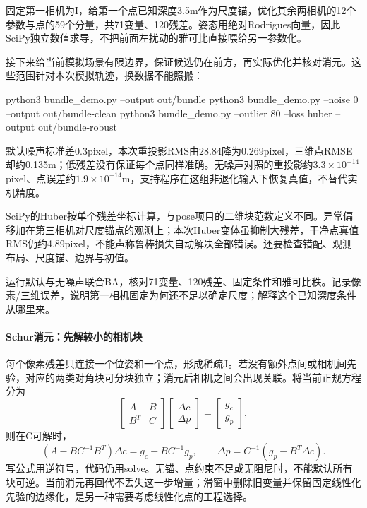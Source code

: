 \begin{example}[真正一起调整位姿和点]
固定第一相机为I，给第一个点已知深度3.5m作为尺度锚，优化其余两相机的12个参数与点的59个分量，共71变量、120残差。姿态用绝对Rodrigues向量，因此SciPy独立数值求导，不把前面左扰动的雅可比直接喂给另一参数化。

接下来给当前模拟场景有限边界，保证候选仍在前方，再实际优化并核对消元。这些范围针对本次模拟轨迹，换数据不能照搬：

\begin{tbash}
python3 bundle_demo.py --output out/bundle
python3 bundle_demo.py --noise 0 --output out/bundle-clean
python3 bundle_demo.py --outlier 80 --loss huber --output out/bundle-robust
\end{tbash}
默认噪声标准差0.3pixel，本次重投影RMS由28.84降为0.269pixel，三维点RMSE却约0.135m；低残差没有保证每个点同样准确。无噪声对照的重投影约$3.3\times10^{-14}$pixel、点误差约$1.9\times10^{-14}$m，支持程序在这组非退化输入下恢复真值，不替代实机精度。

SciPy的Huber按单个残差坐标计算，与pose项目的二维块范数定义不同。异常偏移加在第三相机对尺度锚点的观测上；本次Huber变体虽抑制大残差，干净点真值RMS仍约4.89pixel，不能声称鲁棒损失自动解决全部错误。还要检查错配、观测布局、尺度锚、边界与初值。
\end{example}
\begin{exercise}\label{ex:v2-ba-bundle}
运行默认与无噪声联合BA，核对71变量、120残差、固定条件和雅可比秩。记录像素/三维误差，说明第一相机固定为何还不足以确定尺度；解释这个已知深度条件从哪里来。
\end{exercise}

\paragraph*{Schur消元：先解较小的相机块}
每个像素残差只连接一个位姿和一个点，形成稀疏J。若没有额外点间或相机间先验，对应的两类对角块可分块独立；消元后相机之间会出现关联。将当前正规方程分为
\[
\begin{bmatrix}A&B\\B^T&C\end{bmatrix}
\begin{bmatrix}\Delta c\\\Delta p\end{bmatrix}
=\begin{bmatrix}g_c\\g_p\end{bmatrix},
\]
则在C可解时，
\[
(A-BC^{-1}B^T)\Delta c=g_c-BC^{-1}g_p,\qquad
\Delta p=C^{-1}(g_p-B^T\Delta c).
\]
写公式用逆符号，代码仍用solve。无锚、点约束不足或无阻尼时，不能默认所有块可逆。当前消元再回代不丢失这一步增量；滑窗中删除旧变量并保留固定线性化先验的边缘化，是另一种需要考虑线性化点的工程选择。

